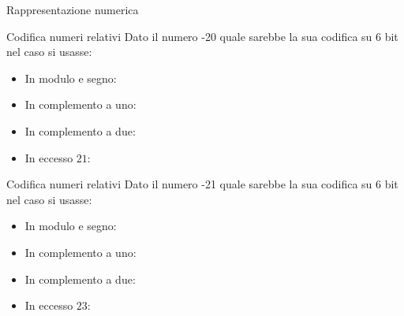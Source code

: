 \documentclass[11pt]{article}
\begin{document}
\begin{quiz}{Rappresentazione numerica}
\begin{cloze}[points=1,shuffle=false]{Codifica numeri relativi}
Dato il numero -20 quale sarebbe la sua codifica su 6 bit nel caso si usasse:
\begin{itemize}
\item In modulo e segno: 
\item In complemento a uno: 
\item In complemento a due: 
\item In eccesso $21$: 
\end{itemize}
\end{cloze}

\begin{cloze}[points=1,shuffle=false]{Codifica numeri relativi}
Dato il numero -21 quale sarebbe la sua codifica su 6 bit nel caso si usasse:
\begin{itemize}
\item In modulo e segno: 
\item In complemento a uno: 
\item In complemento a due: 
\item In eccesso $23$: 
\end{itemize}
\end{cloze}


\end{quiz}
\end{document}
